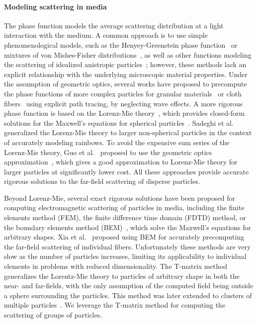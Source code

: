 \paragraph{Modeling scattering in media}
%
The phase function models the average scattering distribution at a light interaction with the medium. A common approach is to use simple phenomenological models, such as the Henyey-Greenstein phase function~\cite{henyey1941diffuse} or mixtures of von Mishes-Fisher distributions~\cite{gkioulekas2013understanding}, as well as other functions modeling the scattering of idealized anistropic particles~\cite{zhao2011building,heitz2015sggx}; however, these methods lack an explicit relationship with the underlying microscopic material properties. Under the assumption of geometric optics, several works have proposed to precompute the phase functions of more complex particles for granular materials~\cite{meng2015multi,muller2016efficient} or cloth fibers~\cite{aliaga2017appearance} using explicit path tracing, by neglecting wave effects. 
%
A more rigorous phase function is based on the Lorenz-Mie theory~\cite{hulst1981light}, which provides closed-form solutions for the Maxwell's equations for spherical particles~\cite{jackel1997modeling,frisvad2007computing}. Sadeghi et al.~ generalized the Lorenz-Mie theory to larger non-spherical particles in the context of accurately modeling rainbows. To avoid the expensive sum series of the Lorenz-Mie theory, Guo et al.~ proposed to use the geometric optics approximation~\cite{glantschnig1981light}, which gives a good approximation to Lorenz-Mie theory for larger particles at significantly lower cost. 
%
All these approaches provide accurate rigorous solutions to the far-field scattering of disperse particles. 

Beyond Lorenz-Mie, several exact rigorous solutions have been proposed for computing  electromagnetic scattering of particles in media, including the finite elements method (FEM), the finite difference time domain (FDTD) method, or the boundary elements method (BEM)~\cite{wu1977scattering}, which solve the Maxwell's equations for arbitrary shapes. Xia et al.~ proposed using BEM for accurately precomputing the far-field scattering of individual fibers. Unfortunately these methods are very slow as the number of particles increases, limiting its applicability to individual elements in problems with reduced dimensionality. 
%
The T-matrix method~\cite{waterman1965matrix} generalizes the Lorentz-Mie theory to particles of arbitrary shape in both the near- and far-fields, with the only assumption of the computed field being outside a sphere surrounding the particles. This method was later extended to clusters of multiple particles~\cite{peterson1973t,mackowski2011multiple}. We leverage the T-matrix method for computing the scattering of groups of particles. 

